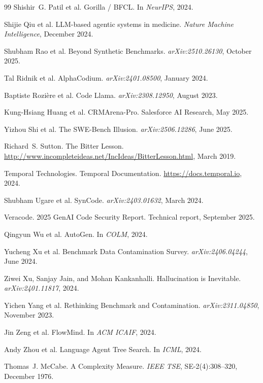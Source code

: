\documentclass[11pt]{article}
\begin{document}
\begin{thebibliography}{99}
Shishir~G. Patil et al. Gorilla / BFCL. In \emph{NeurIPS}, 2024.

Shijie Qiu et al. LLM-based agentic systems in medicine. \emph{Nature Machine Intelligence}, December 2024.

Shubham Rao et al. Beyond Synthetic Benchmarks. \emph{arXiv:2510.26130}, October 2025.

Tal Ridnik et al. AlphaCodium. \emph{arXiv:2401.08500}, January 2024.

Baptiste Rozi\`{e}re et al. Code Llama. \emph{arXiv:2308.12950}, August 2023.

Kung-Hsiang Huang et al. CRMArena-Pro. Salesforce AI Research, May 2025.

Yizhou Shi et al. The SWE-Bench Illusion. \emph{arXiv:2506.12286}, June 2025.

Richard~S. Sutton. The Bitter Lesson. \url{http://www.incompleteideas.net/IncIdeas/BitterLesson.html}, March 2019.

Temporal Technologies. Temporal Documentation. \url{https://docs.temporal.io}, 2024.

Shubham Ugare et al. SynCode. \emph{arXiv:2403.01632}, March 2024.

Veracode. 2025 GenAI Code Security Report. Technical report, September 2025.

Qingyun Wu et al. AutoGen. In \emph{COLM}, 2024.

Yucheng Xu et al. Benchmark Data Contamination Survey. \emph{arXiv:2406.04244}, June 2024.

Ziwei Xu, Sanjay Jain, and Mohan Kankanhalli. Hallucination is Inevitable. \emph{arXiv:2401.11817}, 2024.

Yichen Yang et al. Rethinking Benchmark and Contamination. \emph{arXiv:2311.04850}, November 2023.

Jin Zeng et al. FlowMind. In \emph{ACM ICAIF}, 2024.

Andy Zhou et al. Language Agent Tree Search. In \emph{ICML}, 2024.

Thomas~J. McCabe. A Complexity Measure. \emph{IEEE TSE}, SE-2(4):308--320, December 1976.

\end{thebibliography}
\end{document}
